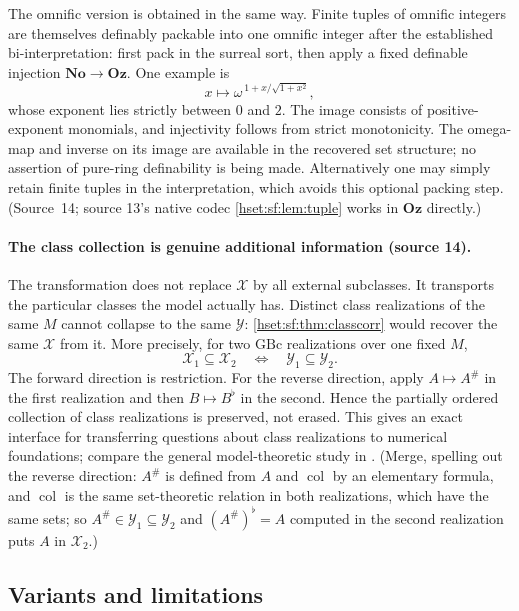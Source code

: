 \documentclass[11pt,letterpaper]{article}
\theoremstyle{definition}
\theoremstyle{remark}
\newcommand{\No}{\mathbf{No}}
\newcommand{\Oz}{\mathbf{Oz}}
\newcommand{\GBc}{\mathrm{GBc}}
\begin{document}
The omnific version is obtained in the same way. Finite tuples of omnific integers
are themselves definably packable into one omnific integer after the established
bi-interpretation: first pack in the surreal sort, then apply a fixed definable
injection $\No\to\Oz$. One example is
\[
 x\longmapsto\omega^{\,1+x/\sqrt{1+x^2}},
\]
whose exponent lies strictly between $0$ and $2$. The image consists of
positive-exponent monomials, and injectivity follows from strict monotonicity. The
omega-map and inverse on its image are available in the recovered set structure; no
assertion of pure-ring definability is being made. Alternatively one may simply
retain finite tuples in the interpretation, which avoids this optional packing step.
(Source~14; source 13's native codec \cref{hset:sf:lem:tuple} works in $\Oz$
directly.)

\paragraph{The class collection is genuine additional information (source 14).}
The transformation does not replace $\mathcal X$ by all external subclasses. It
transports the particular classes the model actually has. Distinct class
realizations of the same $M$ cannot collapse to the same $\mathcal Y$:
\cref{hset:sf:thm:classcorr} would recover the same $\mathcal X$ from it. More
precisely, for two $\GBc$ realizations over one fixed $M$,
\begin{equation}\label{hset:sf:eq:inclusion}
 \mathcal X_1\subseteq\mathcal X_2\quad\Longleftrightarrow\quad\mathcal Y_1\subseteq\mathcal Y_2.
\end{equation}
The forward direction is restriction. For the reverse direction, apply
$A\mapsto A^\#$ in the first realization and then $B\mapsto B^\flat$ in the second.
Hence the partially ordered collection of class realizations is preserved, not
erased. This gives an exact interface for transferring questions about class
realizations to numerical foundations; compare the general model-theoretic study in
\cite{WilliamsDiss}. (Merge, spelling out the reverse direction: $A^\#$ is defined from $A$ and
$\operatorname{col}$ by an elementary formula, and $\operatorname{col}$ is the same
set-theoretic relation in both realizations, which have the same sets; so
$A^\#\in\mathcal Y_1\subseteq\mathcal Y_2$ and $(A^\#)^\flat=A$ computed in the
second realization puts $A$ in $\mathcal X_2$.)

\subsection{Variants and limitations}
\end{document}
